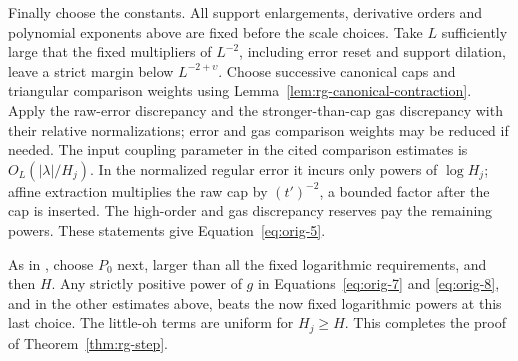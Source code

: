 Finally choose the constants.  All support enlargements, derivative
orders and polynomial exponents above are fixed before the scale
choices.  Take $L$ sufficiently large that the fixed multipliers of
$L^{-2}$, including error reset and support dilation, leave a strict
margin below $L^{-2+\upsilon}$.  Choose successive canonical caps and
triangular comparison weights using
Lemma~\ref{lem:rg-canonical-contraction}.  Apply the raw-error
discrepancy and the stronger-than-cap gas discrepancy with their
relative normalizations; error and gas comparison weights may be
reduced if needed.  The input coupling parameter in the cited
comparison estimates is $O_L(|\lambda|/H_j)$.  In the normalized
regular error it incurs only powers of $\log H_j$; affine extraction
multiplies the raw cap by $(t')^{-2}$, a bounded factor after the cap
is inserted.  The high-order and gas discrepancy reserves pay the
remaining powers.  These statements give
Equation~\eqref{eq:orig-5}.

As in , choose $P_0$ next, larger than all the
fixed logarithmic requirements, and then $H$.  Any strictly positive
power of $g$ in Equations~\eqref{eq:orig-7} and \eqref{eq:orig-8},
and in the other estimates above, beats the now fixed logarithmic
powers at this last choice.  The little-oh terms are uniform for
$H_j\ge H$.  This completes the proof of
Theorem~\ref{thm:rg-step}.
